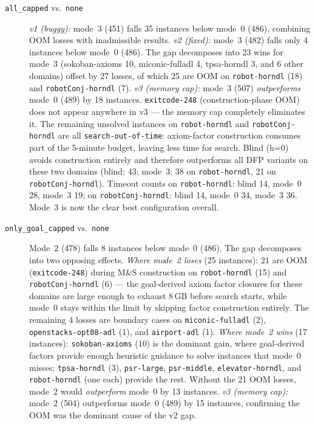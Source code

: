 \documentclass[11pt,a4paper]{article}
\begin{document}
\begin{description}

  \item[\texttt{all\_capped} vs.\ \texttt{none}]
    \emph{v1 (buggy):} mode~3 (451) falls 35 instances below mode~0 (486),
    combining OOM losses with inadmissible results.
    \emph{v2 (fixed):} mode~3 (482) falls only 4 instances below mode~0 (486).
    The gap decomposes into 23 wins for mode~3 (sokoban-axioms 10,
    miconic-fulladl 4, tpsa-horndl 3, and 6 other domains) offset by
    27 losses, of which 25 are OOM on \texttt{robot-horndl} (18) and
    \texttt{robotConj-horndl} (7).
    \emph{v3 (memory cap):} mode~3 (507) \emph{outperforms} mode~0 (489) by
    18 instances.  \texttt{exitcode-248} (construction-phase OOM) does not
    appear anywhere in v3 --- the memory cap completely eliminates it.
    The remaining unsolved instances on \texttt{robot-horndl} and
    \texttt{robotConj-horndl} are all \texttt{search-out-of-time}: axiom-factor
    construction consumes part of the 5-minute budget, leaving less time for
    search.  Blind (h=0) avoids construction entirely and therefore
    outperforms all DFP variants on these two domains (blind: 43; mode~3: 38
    on \texttt{robot-horndl}, 21 on \texttt{robotConj-horndl}).
    Timeout counts on \texttt{robot-horndl}: blind 14, mode~0 28, mode~3 19;
    on \texttt{robotConj-horndl}: blind 14, mode~0 34, mode~3 36.
    Mode~3 is now the clear best configuration overall.

  \item[\texttt{only\_goal\_capped} vs.\ \texttt{none}]
    Mode~2 (478) falls 8 instances below mode~0 (486).  The gap decomposes
    into two opposing effects.
    \emph{Where mode~2 loses} (25 instances): 21 are OOM (\texttt{exitcode-248})
    during M\&S construction on \texttt{robot-horndl} (15) and
    \texttt{robotConj-horndl} (6) --- the goal-derived axiom factor closures
    for these domains are large enough to exhaust 8\,GB before search starts,
    while mode~0 stays within the limit by skipping factor construction entirely.
    The remaining 4 losses are boundary cases on \texttt{miconic-fulladl} (2),
    \texttt{openstacks-opt08-adl} (1), and \texttt{airport-adl} (1).
    \emph{Where mode~2 wins} (17 instances): \texttt{sokoban-axioms} (10)
    is the dominant gain, where goal-derived factors provide enough heuristic
    guidance to solve instances that mode~0 misses; \texttt{tpsa-horndl} (3),
    \texttt{psr-large}, \texttt{psr-middle}, \texttt{elevator-horndl}, and
    \texttt{robot-horndl} (one each) provide the rest.
    Without the 21 OOM losses, mode~2 would \emph{outperform} mode~0 by
    13 instances.
    \emph{v3 (memory cap):} mode~2 (504) outperforms mode~0 (489) by 15
    instances, confirming the OOM was the dominant cause of the v2 gap.


\end{description}
\end{document}
